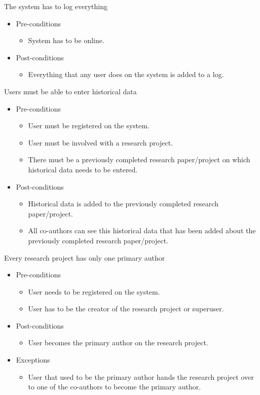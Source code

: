 \documentclass[a4paper,12pt]{report}
\begin{document}
	The system has to log everything
	\begin{itemize}
		\item Pre-conditions
			\begin{itemize}
				\item System has to be online.
			\end{itemize}
		\item Post-conditions
			\begin{itemize}
				\item Everything that any user does on the system is added to a log.
			\end{itemize}
	\end{itemize}

	Users must be able to enter historical data
	\begin{itemize}
		\item Pre-conditions
			\begin{itemize}
				\item User must be registered on the system.
				\item User must be involved with a research project.
				\item There must be a previously completed research paper/project on which historical data needs to be entered.
			\end{itemize}
		\item Post-conditions
			\begin{itemize}
				\item Historical data is added to the previously completed research paper/project.
				\item All co-authors can see this historical data that has been added about the previously completed research paper/project.
			\end{itemize}
	\end{itemize}

	Every research project has only one primary author
	\begin{itemize}
		\item Pre-conditions
			\begin{itemize}
				\item User needs to be registered on the system.
				\item User has to be the creator of the research project or superuser.
			\end{itemize}
		\item Post-conditions
			\begin{itemize}
				\item User becomes the primary author on the research project.
			\end{itemize}
		\item Exceptions
			\begin{itemize}
				\item User that used to be the primary author hands the research project over to one of the co-authors to become the primary author.
			\end{itemize}
	\end{itemize}
\end{document}

